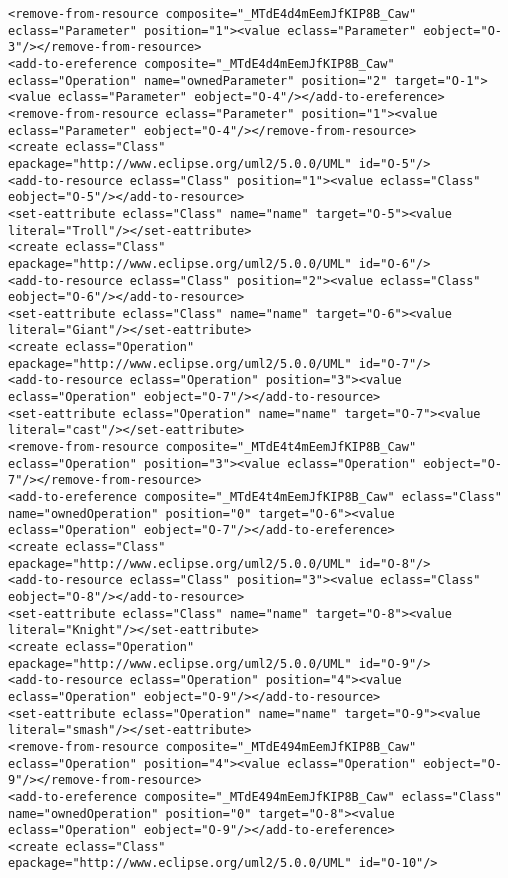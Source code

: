 \begin{lstlisting}[style=cbpfile,caption={Change-based representation of the model in Figure \ref{fig:class_diagram_left}.},label=lst:class_diagram_left_cbpfile]
<remove-from-resource composite="_MTdE4d4mEemJfKIP8B_Caw" eclass="Parameter" position="1"><value eclass="Parameter" eobject="O-3"/></remove-from-resource>
<add-to-ereference composite="_MTdE4d4mEemJfKIP8B_Caw" eclass="Operation" name="ownedParameter" position="2" target="O-1"><value eclass="Parameter" eobject="O-4"/></add-to-ereference>
<remove-from-resource eclass="Parameter" position="1"><value eclass="Parameter" eobject="O-4"/></remove-from-resource>
<create eclass="Class" epackage="http://www.eclipse.org/uml2/5.0.0/UML" id="O-5"/>
<add-to-resource eclass="Class" position="1"><value eclass="Class" eobject="O-5"/></add-to-resource>
<set-eattribute eclass="Class" name="name" target="O-5"><value literal="Troll"/></set-eattribute>
<create eclass="Class" epackage="http://www.eclipse.org/uml2/5.0.0/UML" id="O-6"/>
<add-to-resource eclass="Class" position="2"><value eclass="Class" eobject="O-6"/></add-to-resource>
<set-eattribute eclass="Class" name="name" target="O-6"><value literal="Giant"/></set-eattribute>
<create eclass="Operation" epackage="http://www.eclipse.org/uml2/5.0.0/UML" id="O-7"/>
<add-to-resource eclass="Operation" position="3"><value eclass="Operation" eobject="O-7"/></add-to-resource>
<set-eattribute eclass="Operation" name="name" target="O-7"><value literal="cast"/></set-eattribute>
<remove-from-resource composite="_MTdE4t4mEemJfKIP8B_Caw" eclass="Operation" position="3"><value eclass="Operation" eobject="O-7"/></remove-from-resource>
<add-to-ereference composite="_MTdE4t4mEemJfKIP8B_Caw" eclass="Class" name="ownedOperation" position="0" target="O-6"><value eclass="Operation" eobject="O-7"/></add-to-ereference>
<create eclass="Class" epackage="http://www.eclipse.org/uml2/5.0.0/UML" id="O-8"/>
<add-to-resource eclass="Class" position="3"><value eclass="Class" eobject="O-8"/></add-to-resource>
<set-eattribute eclass="Class" name="name" target="O-8"><value literal="Knight"/></set-eattribute>
<create eclass="Operation" epackage="http://www.eclipse.org/uml2/5.0.0/UML" id="O-9"/>
<add-to-resource eclass="Operation" position="4"><value eclass="Operation" eobject="O-9"/></add-to-resource>
<set-eattribute eclass="Operation" name="name" target="O-9"><value literal="smash"/></set-eattribute>
<remove-from-resource composite="_MTdE494mEemJfKIP8B_Caw" eclass="Operation" position="4"><value eclass="Operation" eobject="O-9"/></remove-from-resource>
<add-to-ereference composite="_MTdE494mEemJfKIP8B_Caw" eclass="Class" name="ownedOperation" position="0" target="O-8"><value eclass="Operation" eobject="O-9"/></add-to-ereference>
<create eclass="Class" epackage="http://www.eclipse.org/uml2/5.0.0/UML" id="O-10"/>

\end{lstlisting}

